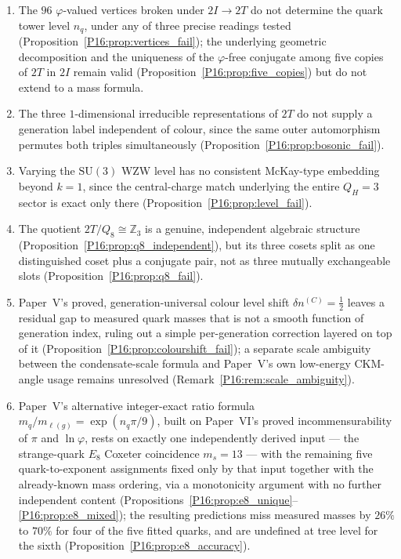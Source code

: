 \documentclass[11pt,a4paper]{article}
\theoremstyle{definition}\newtheorem{definition}[theorem]{Definition}
\theoremstyle{remark}
\theoremstyle{definition}\newtheorem{construction}[theorem]{Construction}
\newcommand{\vp}{\varphi}
\newcommand{\SU}{\mathrm{SU}}
\newcommand{\twoI}{2I}
\newcommand{\twoT}{2T}
\newcommand{\QH}{Q_H}
\begin{document}
\begin{enumerate}[noitemsep]
\item The $96$ $\vp$-valued vertices broken under $\twoI\to\twoT$ do
  not determine the quark tower level $n_q$, under any of three
  precise readings tested (Proposition~\ref{P16:prop:vertices_fail}); the
  underlying geometric decomposition and the uniqueness of the
  $\vp$-free conjugate among five copies of $\twoT$ in $\twoI$ remain
  valid (Proposition~\ref{P16:prop:five_copies}) but do not extend to a
  mass formula.
\item The three $1$-dimensional irreducible representations of
  $\twoT$ do not supply a generation label independent of colour,
  since the same outer automorphism permutes both triples
  simultaneously (Proposition~\ref{P16:prop:bosonic_fail}).
\item Varying the $\SU(3)$ WZW level has no consistent McKay-type
  embedding beyond $k=1$, since the central-charge match underlying
  the entire $\QH=3$ sector is exact only there
  (Proposition~\ref{P16:prop:level_fail}).
\item The quotient $\twoT/Q_8\cong\mathbb{Z}_3$ is a genuine,
  independent algebraic structure (Proposition~\ref{P16:prop:q8_independent}),
  but its three cosets split as one distinguished coset plus a
  conjugate pair, not as three mutually exchangeable slots
  (Proposition~\ref{P16:prop:q8_fail}).
\item Paper~V's proved, generation-universal colour level shift
  $\delta n^{(C)}=\tfrac12$ leaves a residual gap to measured quark
  masses that is not a smooth function of generation index, ruling
  out a simple per-generation correction layered on top of it
  (Proposition~\ref{P16:prop:colourshift_fail}); a separate scale ambiguity
  between the condensate-scale formula and Paper~V's own
  low-energy CKM-angle usage remains unresolved
  (Remark~\ref{P16:rem:scale_ambiguity}).
\item Paper~V's alternative integer-exact ratio formula
  $m_q/m_{\ell(g)}=\exp(n_q\pi/9)$, built on Paper~VI's proved
  incommensurability of $\pi$ and $\ln\vp$, rests on exactly one
  independently derived input --- the strange-quark $E_8$ Coxeter
  coincidence $m_s=13$ --- with the remaining five quark-to-exponent
  assignments fixed only by that input together with the already-known
  mass ordering, via a monotonicity argument with no further
  independent content (Propositions~\ref{P16:prop:e8_unique}--\ref{P16:prop:e8_mixed});
  the resulting predictions miss measured masses by $26\%$ to $70\%$
  for four of the five fitted quarks, and are undefined at tree level
  for the sixth (Proposition~\ref{P16:prop:e8_accuracy}).
\end{enumerate}
\end{document}
